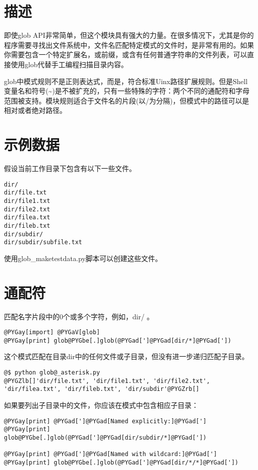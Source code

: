 \documentclass[a4paper,10pt,english]{manual}
\begin{document}
\section{描述}

即使glob API非常简单，但这个模块具有强大的力量。在很多情况下，尤其是你的程序需要寻找出文件系统中，文件名匹配特定模式的文件时，是非常有用的。如果你需要包含一个特定扩展名，或前缀，或含有任何普通字符串的文件列表，可以直接使用glob代替手工编程扫描目录内容。

glob中模式规则不是正则表达式，而是，符合标准Uinx路径扩展规则。但是Shell变量名和符号(\textasciitilde{})是不被扩充的，只有一些特殊的字符：两个不同的通配符和字母范围被支持。模块规则适合于文件名的片段(以/为分隔)，但模式中的路径可以是相对或者绝对路径。


\section{示例数据}

假设当前工作目录下包含有以下一些文件。

\begin{Verbatim}[commandchars=@\[\]]
dir/
dir/file.txt
dir/file1.txt
dir/file2.txt
dir/filea.txt
dir/fileb.txt
dir/subdir/
dir/subdir/subfile.txt
\end{Verbatim}

使用glob\_maketestdata.py脚本可以创建这些文件。


\section{通配符}

\code{*} 匹配名字片段中的0个或多个字符，例如，dir/\code{*} 。

\begin{Verbatim}[commandchars=@\[\]]
@PYGay[import] @PYGaV[glob]
@PYGay[print] glob@PYGbe[.]glob(@PYGad[']@PYGad[dir/*]@PYGad['])
\end{Verbatim}

这个模式匹配在目录dir中的任何文件或子目录，但没有进一步递归匹配子目录。

\begin{Verbatim}[commandchars=@\[\]]
@$ python glob@_asterisk.py
@PYGZlb[]'dir/file.txt', 'dir/file1.txt', 'dir/file2.txt',
'dir/filea.txt', 'dir/fileb.txt', 'dir/subdir'@PYGZrb[]
\end{Verbatim}

如果要列出子目录中的文件，你应该在模式中包含相应子目录：

\begin{Verbatim}[commandchars=@\[\]]
@PYGay[print] @PYGad[']@PYGad[Named explicitly:]@PYGad[']
@PYGay[print] glob@PYGbe[.]glob(@PYGad[']@PYGad[dir/subdir/*]@PYGad['])

@PYGay[print] @PYGad[']@PYGad[Named with wildcard:]@PYGad[']
@PYGay[print] glob@PYGbe[.]glob(@PYGad[']@PYGad[dir/*/*]@PYGad['])
\end{Verbatim}
\end{document}
